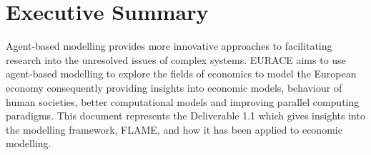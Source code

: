 \documentclass[a4paper,11pt]{article}
\begin{document}



\tableofcontents
\pagebreak
\listoffigures
\pagebreak
\listoftables
\pagebreak

\section*{Executive Summary}

Agent-based modelling provides more innovative approaches to
facilitating research into the unresolved issues of complex systems.
EURACE aims to use agent-based modelling to explore the fields of
economics to model the European economy consequently providing
insights into economic models, behaviour of human societies, better
computational models and improving parallel computing paradigms.
This document represents the Deliverable 1.1 which gives insights
into the modelling framework, FLAME, and how it has been applied to
economic modelling.
\end{document}
